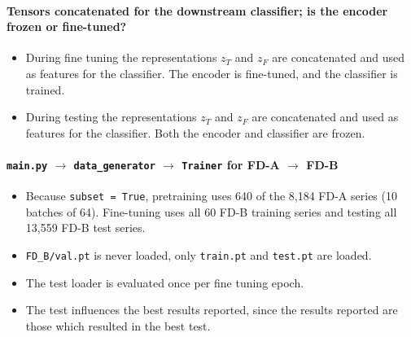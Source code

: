 \documentclass[a4paper,11pt]{article}
\newcommand{\code}[1]{\texttt{#1}}
\begin{document}
\paragraph{Tensors concatenated for the downstream classifier; is the encoder frozen or fine-tuned?}
\begin{itemize}
\item During fine tuning the representations $z_T$ and $z_F$ are concatenated and used as features for the classifier. The encoder is fine-tuned, and the classifier is trained.
\item During testing the representations $z_T$ and $z_F$ are concatenated and used as features for the classifier. Both the encoder and classifier are frozen.
\end{itemize}

\paragraph{\code{main.py} $\rightarrow$ \code{data\_generator} $\rightarrow$ \code{Trainer} for FD-A $\rightarrow$ FD-B}
\begin{itemize}
\item Because \code{subset = True}, pretraining uses 640 of the 8,184 FD-A series (10 batches of 64). Fine-tuning uses all 60 FD-B training series and testing all 13,559 FD-B test series.
\item \code{FD\_B/val.pt} is never loaded, only \code{train.pt} and \code{test.pt} are loaded.
\item The test loader is evaluated once per fine tuning epoch.
\item The test influences the best results reported, since the results reported are those which resulted in the best test.
\end{itemize}
\end{document}
